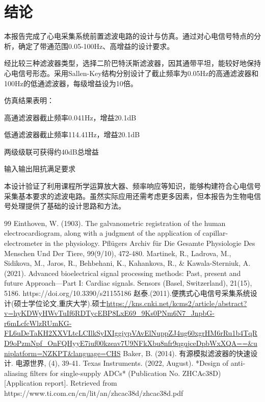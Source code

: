 \documentclass[10pt,a4paper]{ctexart}
\begin{document}
\section{结论}

本报告完成了心电采集系统前置滤波电路的设计与仿真。通过对心电信号特点的分析，确定了带通范围0.05-100Hz、高增益的设计要求。


经比较三种滤波器类型，选择二阶巴特沃斯滤波器，因其通带平坦，能较好地保持心电信号形态。采用Sallen-Key结构分别设计了截止频率为0.05Hz的高通滤波器和100Hz的低通滤波器，每级增益设为10倍。

仿真结果表明：

高通滤波器截止频率0.041Hz，增益20.1dB

低通滤波器截止频率114.41Hz，增益20.1dB

两级级联可获得约40dB总增益

输入输出阻抗满足要求

本设计验证了利用课程所学运算放大器、频率响应等知识，能够构建符合心电信号采集基本要求的滤波电路。虽然实际应用还需考虑更多因素，但本报告为生物电信号处理提供了基础的设计思路和方法。
\begin{thebibliography}{99} 
     Einthoven, W. (1903). The galvanometric registration of the human electrocardiogram, along with a judgment of the application of capillar-electrometer in the physiology. Pflügers Archiv für Die Gesamte Physiologie Des Menschen Und Der Tiere, 99(9/10), 472-480.
     Martinek, R., Ladrova, M., Sidikova, M., Jaros, R., Behbehani, K., Kahankova, R., \& Kawala-Sterniuk, A. (2021). Advanced bioelectrical signal processing methods: Past, present and future Approach—Part I: Cardiac signals. Sensors (Basel, Switzerland), 21(15), 5186. https://doi.org/10.3390/s21155186
    赵泰.(2011).便携式心电信号采集系统设计(硕士学位论文,重庆大学).硕士\url{https://kns.cnki.net/kcms2/article/abstract?v=hyKDWyHWvTuIf6RDTycEBP8LxE69_9Ks0PNm6N7_JnpbG-r6mLcfcWlzRUmKG-FL6uDeTaKH2XXVLtcLCIlkSyIXIggiypVAvElNuppZJ4ug60xgrHM6rRu1b4TqRD9oPzmNpf_OnFQHyyE7iuf00kzeav7U9NFkXbu8nfr9qgqjceDpbWxXQA==&uniplatform=NZKPT&language=CHS}
     Baker, B. (2014). 有源模拟滤波器的快速设计. 电源世界, (4), 39-41.
    Texas Instruments. (2022, August). *Design of anti-aliasing filters for single-supply ADCs* (Publication No. ZHCAc38D) [Application report]. Retrieved from https://www.ti.com.cn/cn/lit/an/zhcac38d/zhcac38d.pdf
\end{thebibliography}



\vspace{1cm}
\end{document}

